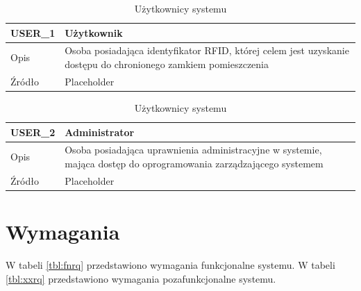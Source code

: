         \begin{table}[h!]
            \caption{Użytkownicy systemu}
            \centering
            \begin{subtable}[c]{\textwidth}
                \centering
                \begin{tabular}{|p{2cm}|p{12cm}|}
                    \hline USER\_1      & \textbf{Użytkownik} \\
                    \hline \cellcolor[gray]{0.8} Opis         & Osoba posiadająca identyfikator RFID, której celem jest uzyskanie dostępu do chronionego zamkiem pomieszczenia  \\
                    \hline \cellcolor[gray]{0.8} Źródło       & Placeholder    \\
                    \hline
                \end{tabular}
                \label{tbl:usr1}
                \vspace{10mm}           
            \end{subtable}
        \quad%
            \begin{subtable}[c]{\textwidth}
                \centering
                \begin{tabular}{|p{2cm}|p{12cm}|}
                    \hline USER\_2      & \textbf{Administrator} \\
                    \hline \cellcolor[gray]{0.8} Opis         & Osoba posiadająca uprawnienia administracyjne w systemie, mająca dostęp do oprogramowania zarządzającego systemem \\
                    \hline \cellcolor[gray]{0.8} Źródło       & Placeholder    \\
                    \hline
                \end{tabular}
                \label{tbl:usr2}       
            \end{subtable}                
            \label{tbl:users}
        \end{table}

    \section{Wymagania}

         W tabeli \ref{tbl:fnrq} przedstawiono wymagania funkcjonalne systemu. W tabeli \ref{tbl:xxrq} przedstawiono wymagania pozafunkcjonalne systemu.


